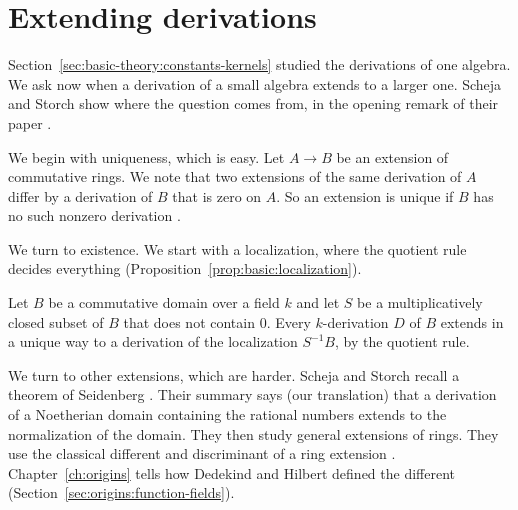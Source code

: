 \section{Extending derivations}\label{sec:basic-theory:extension}

Section~\ref{sec:basic-theory:constants-kernels} studied the derivations of one
algebra. We ask now when a derivation of a small algebra extends to a larger
one. Scheja and Storch show where the question comes from, in the opening remark of their paper 
\cite[p.~353]{SchejaStorch1978}.

We begin with uniqueness, which is easy. Let $A \to B$ be an extension of
commutative rings. We note that two extensions of the same derivation of $A$
differ by a derivation of $B$ that is zero on $A$. So an extension is unique if
$B$ has no such nonzero derivation \cite[\S1, p.~354]{SchejaStorch1978}.

We turn to existence. We start with a localization, where the quotient rule decides everything (Proposition~\ref{prop:basic:localization}).

\begin{proposition}\label{prop:basic:localization}
Let $B$ be a commutative domain over a field $k$ and let $S$ be a multiplicatively closed subset of $B$ that does not contain $0$. Every $k$-derivation $D$ of $B$ extends in a unique way to a derivation of the localization $S^{-1}B$, by the quotient rule.
\end{proposition}

We turn to other extensions, which are harder. Scheja and Storch recall a theorem of Seidenberg \cite[p.~353]{SchejaStorch1978}. Their summary says (our translation)
that a derivation of a Noetherian domain containing the rational numbers extends
to the normalization of the domain. They then study general extensions of rings.
They use the classical different and discriminant of a ring extension \cite[p.~353]{SchejaStorch1978}. Chapter~\ref{ch:origins}
tells how Dedekind and Hilbert defined the different
(Section~\ref{sec:origins:function-fields}).

